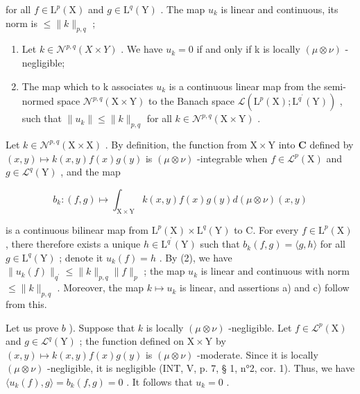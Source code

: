 for all \(f \in \mathrm{L}^p(\mathrm{X})\) and \(g \in \mathrm{L}^q(\mathrm{Y})\) . The map \(u_k\) is linear and continuous, its norm is \(\leqslant \| k\|_{p,q}\) ;

\begin{enumerate}
\def\labelenumi{\alph{enumi})}
\setcounter{enumi}{1}
\item
  Let \(k \in \mathcal{N}^{p,q}(X \times Y)\) . We have \(u_k = 0\) if and only if k is locally \((\mu \otimes \nu)\) -negligible;
\item
  The map which to k associates \(u_{k}\) is a continuous linear map from the semi-normed space \(\mathcal{N}^{p,q}(\mathrm{X}\times\mathrm{Y})\) to the Banach space \(\mathcal{L}(\mathrm{L}^{p}(\mathrm{X});\mathrm{L}^{q^{\prime}}(\mathrm{Y}))\) , such that \(\|u_{k}\|\leqslant\|k\|_{p,q}\) for all \(k\in\mathcal{N}^{p,q}(\mathrm{X}\times\mathrm{Y})\) .
\end{enumerate}

Let \(k \in \mathcal{N}^{p,q}(\mathrm{X} \times \mathrm{X})\) . By definition, the function from \(\mathrm{X} \times \mathrm{Y}\) into \(\mathbf{C}\) defined by \((x,y) \mapsto k(x,y)f(x)g(y)\) is \((\mu \otimes \nu)\) -integrable when \(f \in \mathcal{L}^p(\mathrm{X})\) and \(g \in \mathcal{L}^q(\mathrm{Y})\) , and the map

\[
b _ {k} \colon (f, g) \mapsto \int_ {\mathrm{X} \times \mathrm{Y}} k (x, y) f (x) g (y) d (\mu \otimes \nu) (x, y)
\]

is a continuous bilinear map from \(\mathrm{L}^{p}(\mathrm{X})\times\mathrm{L}^{q}(\mathrm{Y})\) to C. For every \(f\in\mathrm{L}^{p}(\mathrm{X})\) , there therefore exists a unique \(h\in\mathrm{L}^{q^{\prime}}(\mathrm{Y})\) such that \(b_{k}(f,g)=\langle g,h\rangle\) for all \(g\in\mathrm{L}^{q}(\mathrm{Y})\) ; denote it \(u_{k}(f)=h\) . By (2), we have \(\|u_{k}(f)\|_{q^{\prime}}\leqslant\|k\|_{p,q}\|f\|_{p}\) ; the map \(u_{k}\) is linear and continuous with norm \(\leqslant\|k\|_{p,q}\) . Moreover, the map \(k\mapsto u_{k}\) is linear, and assertions a) and c) follow from this.

Let us prove \(b\) ). Suppose that \(k\) is locally \((\mu \otimes \nu)\) -negligible. Let \(f \in \mathcal{L}^p(\mathrm{X})\) and \(g \in \mathcal{L}^q(\mathrm{Y})\) ; the function defined on \(\mathrm{X} \times \mathrm{Y}\) by \((x, y) \mapsto k(x, y)f(x)g(y)\) is \((\mu \otimes \nu)\) -moderate. Since it is locally \((\mu \otimes \nu)\) -negligible, it is negligible (INT, V, p. 7, § 1, n°2, cor. 1). Thus, we have \(\langle u_k(f), g \rangle = b_k(f, g) = 0\) . It follows that \(u_k = 0\) .

